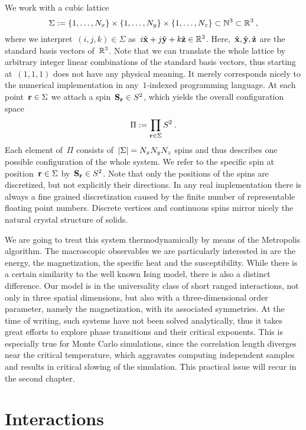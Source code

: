 We work with a cubic lattice
%
\begin{equation}
  \Sigma := \{1,\dots,N_x\} \times \{1,\dots,N_y\} \times
  \{1,\dots,N_z\} \subset \mathbb{N}^3 \subset \mathbb{R}^3\:,
\end{equation}
%
where we interpret~$(i,j,k) \in \Sigma$ as~$i \hat{\mathbf{x}} + j \hat{\mathbf{y}} + k \hat{\mathbf{z}}
\in \mathbb{R}^3$. Here,~$\hat{\mathbf{x}}, \hat{\mathbf{y}}, \hat{\mathbf{z}}$ are the standard basis vectors of~$\mathbb{R}^3$.
Note that we can translate the whole lattice by arbitrary integer linear
combinations of the standard basis vectors, thus starting at~$(1,1,1)$ does not
have any physical meaning. It merely corresponds nicely to the numerical
implementation in any~$1$-indexed programming language. At each point~$\mathbf{r} \in
\Sigma$ we attach a spin~$\mathbf{S}_{\mathbf{r}} \in S^2$, which yields the overall
configuration space
%
\begin{equation}
  \Pi := \prod_{\mathbf{r} \in \Sigma} S^2\:.
\end{equation}
%
Each element of~$\Pi$ consists of~$\abs{\Sigma}=N_x N_y N_z$ spins and thus
describes one possible configuration of the whole system. We refer to the
specific spin at position~$\mathbf{r} \in \Sigma$ by~$\mathbf{S}_{\mathbf{r}} \in S^2$. Note that only
the positions of the spins are discretized, but not explicitly their directions.
In any real implementation there is always a fine grained discretization caused
by the finite number of representable floating point numbers. Discrete vertices
and continuous spins mirror nicely the natural crystal structure of solids.

We are going to treat this system thermodynamically by means of the Metropolis
algorithm. The macroscopic observables we are particularly interested in are the
energy, the magnetization, the specific heat and the susceptibility. While there
is a certain similarity to the well known Ising model, there is also a distinct
difference. Our model is in the universality class of short ranged interactions,
not only in three spatial dimensions, but also with a three-dimensional order
parameter, namely the magnetization, with its associated symmetries. At the time
of writing, such systems have not been solved analytically, thus it takes great
efforts to explore phase transitions and their critical exponents. This is
especially true for Monte Carlo simulations, since the correlation length
diverges near the critical temperature, which aggravates computing independent
samples and results in critical slowing of the simulation. This practical issue
will recur in the second chapter.
%
\section{Interactions}\label{sec:interactions}
%

